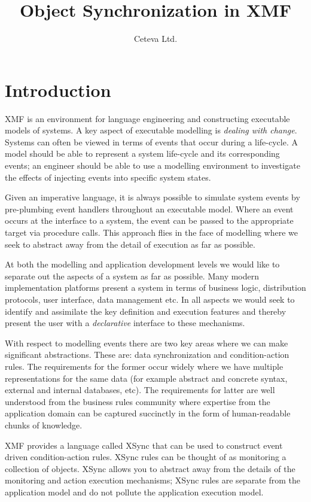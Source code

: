 \documentclass{article}
\title{Object Synchronization in XMF}
\author{Ceteva Ltd.}
\begin{document}
\maketitle

\section{Introduction}

XMF is an environment for language engineering and constructing executable models of systems.
A key aspect of executable modelling is {\em dealing with change}. Systems can often be viewed
in terms of events that occur during a life-cycle. A model should be able to represent a system
life-cycle and its corresponding events; an engineer should be able to use a modelling
environment to investigate the effects of injecting events into specific system states.

Given an imperative language, it is always possible to simulate system events by pre-plumbing
event handlers throughout an executable model. Where an event occurs at the interface to a system, 
the event can be passed to the appropriate target via procedure calls. This approach flies in the
face of modelling where we seek to abstract away from the detail of execution as far as possible.

At both the modelling and application development levels we would like to separate out the
aspects of a system as far as possible. Many modern implementation platforms present a system
in terms of business logic, distribution protocols, user interface, data management etc.
In all aspects we would seek to identify and assimilate the key definition and execution
features and thereby present the user with a {\em declarative} interface to these mechanisms.

With respect to modelling events there are two key areas where we can make significant 
abstractions. These are: data synchronization and condition-action rules. The requirements
for the former occur widely where we have multiple representations for the same data (for
example abstract and concrete syntax, external and internal databases, etc). The
requirements for latter are well understood from the business rules community where
expertise from the application domain can be captured succinctly in the form of human-readable
chunks of knowledge.

XMF provides a language called XSync that can be used to construct event driven condition-action
rules. XSync rules can be thought of as monitoring a collection of objects. XSync allows you to 
abstract away from the details of the monitoring and action execution mechanisms; XSync
rules are separate from the application model and do not pollute the application execution model.
\end{document}
